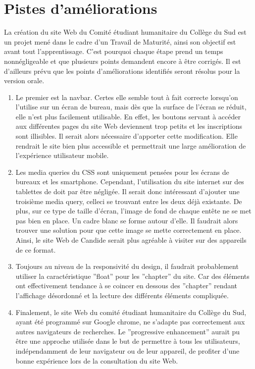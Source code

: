 \documentclass[a4,10pt,french]{sphinxmanual}
\begin{document}
\section{Pistes d’améliorations}
\label{\detokenize{chapitre-03:pistes-dameliorations}}
\sphinxAtStartPar
La création du site Web du Comité étudiant humanitaire du Collège du Sud est un projet mené dans le cadre d’un Travail de Maturité, ainsi son objectif est avant tout l’apprentissage. C’est pourquoi chaque étape prend un temps non\sphinxhyphen{}négligeable et que plusieurs points demandent encore à être corrigés. Il est d’ailleurs prévu que les points d’améliorations identifiés seront résolus pour la version orale.
\begin{enumerate}
%
\item {} 
\sphinxAtStartPar
Le premier est la nav\sphinxhyphen{}bar. Certes elle semble tout à fait correcte lorsqu’on l’utilise sur un écran de bureau, mais dès que la surface de l’écran se réduit, elle n’est plus facilement utilisable. En effet, les boutons servant à accéder aux différentes pages du site Web deviennent trop petits et les inscriptions sont illisibles. Il serait alors nécessaire d’apporter cette modification. Elle rendrait le site bien plus accessible et permettrait une large amélioration de l’expérience utilisateur mobile.

\item {} 
\sphinxAtStartPar
Les media queries du CSS sont uniquement pensées pour les écrans de bureaux et les smartphone. Cependant, l’utilisation du site internet sur des tablettes de doit par être négligée. Il serait donc intéressant d’ajouter une troisième media query, celle\sphinxhyphen{}ci se trouvant entre les deux déjà existante. De plus, sur ce type de taille d’écran, l’image de fond de chaque entête ne se met pas bien en place. Un cadre blanc se forme autour d’elle. Il faudrait alors trouver une solution pour que cette image se mette correctement en place.  Ainsi, le site Web de Candide serait plus agréable à visiter sur des appareils de ce format.

\item {} 
\sphinxAtStartPar
Toujours au niveau de la responsivité du design, il faudrait probablement utiliser la caractéristique ”float” pour les ”chapter” du site. Car des éléments ont effectivement tendance à se coincer en dessous des ”chapter” rendant l’affichage désordonné et la lecture des différents éléments compliquée.

\item {} 
\sphinxAtStartPar
Finalement, le site Web du comité étudiant humanitaire du Collège du Sud, ayant été programmé sur Google chrome, ne s’adapte pas correctement aux autres navigateurs de recherches. Le ”progressive enhancement” aurait pu être une approche utilisée dans le but de permettre à tous les utilisateurs, indépendamment de leur navigateur ou de leur appareil, de profiter d’une bonne expérience lors de la consultation du site Web.

\end{enumerate}
\end{document}
